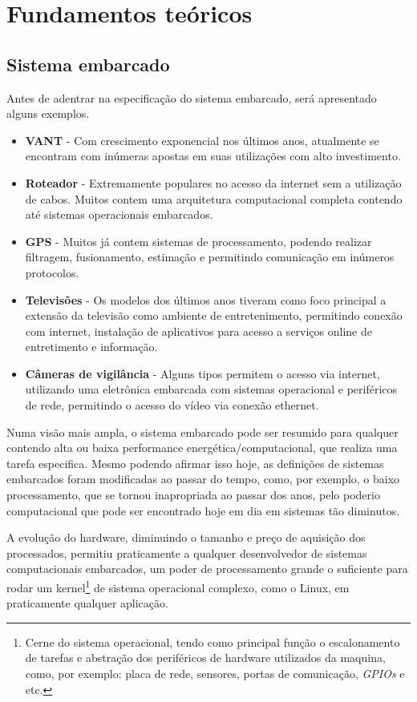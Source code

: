 \chapter{Fundamentos teóricos}

\section{Sistema embarcado}
Antes de adentrar na especificação do sistema embarcado, será apresentado alguns exemplos.

\begin{itemize}
\item \textbf{VANT} - Com crescimento exponencial nos últimos anos, atualmente se encontram com inúmeras apostas em suas utilizações com alto investimento.
\item \textbf{Roteador} - Extremamente populares no acesso da internet sem a utilização de cabos. Muitos contem uma arquitetura computacional completa contendo até sistemas operacionais embarcados.
\item \textbf{GPS} - Muitos já contem sistemas de processamento, podendo realizar filtragem, fusionamento, estimação e permitindo comunicação em inúmeros protocolos.
\item \textbf{Televisões} - Os modelos dos últimos anos tiveram como foco principal a extensão da televisão como ambiente de entretenimento, permitindo conexão com internet, instalação de aplicativos para acesso a serviços online de entretimento e informação.
\item \textbf{Câmeras de vigilância} - Alguns tipos permitem o acesso via internet, utilizando uma eletrônica embarcada com sistemas operacional e periféricos de rede, permitindo o acesso do vídeo via conexão ethernet.
\end{itemize}


Numa visão mais ampla, o sistema embarcado pode ser resumido para qualquer contendo alta ou baixa performance energética/computacional,
que realiza uma tarefa especifica. Mesmo podendo afirmar isso hoje, as definições de sistemas embarcados foram modificadas ao passar do
tempo, como, por exemplo, o baixo processamento, que se tornou inapropriada ao passar dos anos, pelo poderio computacional que pode ser
encontrado hoje em dia em sistemas tão diminutos.

A evolução do hardware, diminuindo o tamanho e preço de aquisição dos processados, permitiu praticamente a qualquer desenvolvedor de
sistemas computacionais embarcados, um poder de processamento grande o suficiente para rodar um kernel\footnote{Cerne do sistema
operacional, tendo como principal função o escalonamento de tarefas e abstração dos periféricos de hardware utilizados da maquina,
como, por exemplo: placa de rede, sensores, portas de comunicação, \textit{GPIOs} e etc.} de sistema operacional complexo, como o Linux, em praticamente qualquer aplicação.

